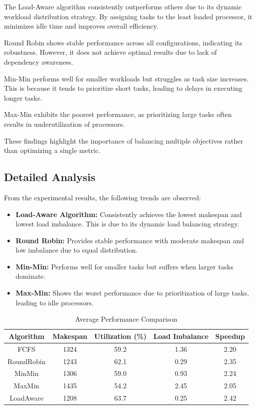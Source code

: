 \documentclass[12pt,a4paper]{article}
\begin{document}
The Load-Aware algorithm consistently outperforms others due to its dynamic workload distribution strategy. By assigning tasks to the least loaded processor, it minimizes idle time and improves overall efficiency.

Round Robin shows stable performance across all configurations, indicating its robustness. However, it does not achieve optimal results due to lack of dependency awareness.

Min-Min performs well for smaller workloads but struggles as task size increases. This is because it tends to prioritize short tasks, leading to delays in executing longer tasks.

Max-Min exhibits the poorest performance, as prioritizing large tasks often results in underutilization of processors.

These findings highlight the importance of balancing multiple objectives rather than optimizing a single metric.

\subsection{Detailed Analysis}

From the experimental results, the following trends are observed:

\begin{itemize}

\item \textbf{Load-Aware Algorithm:} 
Consistently achieves the lowest makespan and lowest load imbalance. This is due to its dynamic load balancing strategy.

\item \textbf{Round Robin:}
Provides stable performance with moderate makespan and low imbalance due to equal distribution.

\item \textbf{Min-Min:}
Performs well for smaller tasks but suffers when larger tasks dominate.

\item \textbf{Max-Min:}
Shows the worst performance due to prioritization of large tasks, leading to idle processors.

\end{itemize}

\begin{table}[h]
\centering
\caption{Average Performance Comparison}
\begin{tabular}{|c|c|c|c|c|}
\hline
Algorithm & Makespan & Utilization (\%) & Load Imbalance & Speedup \\
\hline
FCFS & 1324 & 59.2 & 1.36 & 2.20 \\
RoundRobin & 1243 & 62.1 & 0.29 & 2.35 \\
MinMin & 1306 & 59.0 & 0.93 & 2.24 \\
MaxMin & 1435 & 54.2 & 2.45 & 2.05 \\
LoadAware & 1208 & 63.7 & 0.25 & 2.42 \\
\hline
\end{tabular}
\end{table}
\end{document}
